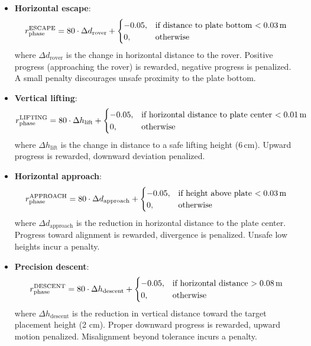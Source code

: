 \documentclass[english, 12pt, a4paper, elec, utf8, a-2b, online]{aaltothesis}
\begin{document}
\begin{itemize}
    \item \textbf{Horizontal escape}:
    \begin{equation}
    r_\text{phase}^\text{ESCAPE} = 80 \cdot \Delta d_\text{rover} +
    \begin{cases}
        -0.05, & \text{if distance to plate bottom $< 0.03$\,m} \\
        0, & \text{otherwise}
    \end{cases}
    \end{equation}
    where $\Delta d_\text{rover}$ is the change in horizontal distance to the rover. Positive progress (approaching the rover) is rewarded, negative progress is penalized. A small penalty discourages unsafe proximity to the plate bottom.

    \item \textbf{Vertical lifting}:
    \begin{equation}
    r_\text{phase}^\text{LIFTING} = 80 \cdot \Delta h_\text{lift} +
    \begin{cases}
        -0.05, & \text{if horizontal distance to plate center $< 0.01$\,m} \\
        0, & \text{otherwise}
    \end{cases}
    \end{equation}
    where $\Delta h_\text{lift}$ is the change in distance to a safe lifting height (6\,cm). Upward progress is rewarded, downward deviation penalized.

    \item \textbf{Horizontal approach}:
    \begin{equation}
    r_\text{phase}^\text{APPROACH} = 80 \cdot \Delta d_\text{approach} +
    \begin{cases}
        -0.05, & \text{if height above plate $< 0.03$\,m} \\
        0, & \text{otherwise}
    \end{cases}
    \end{equation}
    where $\Delta d_\text{approach}$ is the reduction in horizontal distance to the plate center. Progress toward alignment is rewarded, divergence is penalized. Unsafe low heights incur a penalty.

    \item \textbf{Precision descent}:
    \begin{equation}
    r_\text{phase}^\text{DESCENT} = 80 \cdot \Delta h_\text{descent} +
    \begin{cases}
        -0.05, & \text{if horizontal distance $> 0.08$\,m} \\
        0, & \text{otherwise}
    \end{cases}
    \end{equation}
    where $\Delta h_\text{descent}$ is the reduction in vertical distance toward the target placement height (2 cm). Proper downward progress is rewarded, upward motion penalized. Misalignment beyond tolerance incurs a penalty.
\end{itemize}
\end{document}
